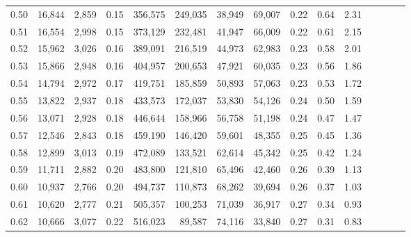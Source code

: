 \begin{tabular}{rrrcrrrrrrrrrrr}
0.50 &  16,844 &  2,859 &                                       0.15 &  356,575 &  249,035 &   38,949 &   69,007 &  0.22 &  0.64 &                         2.31 \\
0.51 &  16,554 &  2,998 &                                       0.15 &  373,129 &  232,481 &   41,947 &   66,009 &  0.22 &  0.61 &                         2.15 \\
0.52 &  15,962 &  3,026 &                                       0.16 &  389,091 &  216,519 &   44,973 &   62,983 &  0.23 &  0.58 &                         2.01 \\
0.53 &  15,866 &  2,948 &                                       0.16 &  404,957 &  200,653 &   47,921 &   60,035 &  0.23 &  0.56 &                         1.86 \\
0.54 &  14,794 &  2,972 &                                       0.17 &  419,751 &  185,859 &   50,893 &   57,063 &  0.23 &  0.53 &                         1.72 \\
0.55 &  13,822 &  2,937 &                                       0.18 &  433,573 &  172,037 &   53,830 &   54,126 &  0.24 &  0.50 &                         1.59 \\
0.56 &  13,071 &  2,928 &                                       0.18 &  446,644 &  158,966 &   56,758 &   51,198 &  0.24 &  0.47 &                         1.47 \\
0.57 &  12,546 &  2,843 &                                       0.18 &  459,190 &  146,420 &   59,601 &   48,355 &  0.25 &  0.45 &                         1.36 \\
0.58 &  12,899 &  3,013 &                                       0.19 &  472,089 &  133,521 &   62,614 &   45,342 &  0.25 &  0.42 &                         1.24 \\
0.59 &  11,711 &  2,882 &                                       0.20 &  483,800 &  121,810 &   65,496 &   42,460 &  0.26 &  0.39 &                         1.13 \\
0.60 &  10,937 &  2,766 &                                       0.20 &  494,737 &  110,873 &   68,262 &   39,694 &  0.26 &  0.37 &                         1.03 \\
0.61 &  10,620 &  2,777 &                                       0.21 &  505,357 &  100,253 &   71,039 &   36,917 &  0.27 &  0.34 &                         0.93 \\
0.62 &  10,666 &  3,077 &                                       0.22 &  516,023 &   89,587 &   74,116 &   33,840 &  0.27 &  0.31 &                         0.83 \\

\end{tabular}
